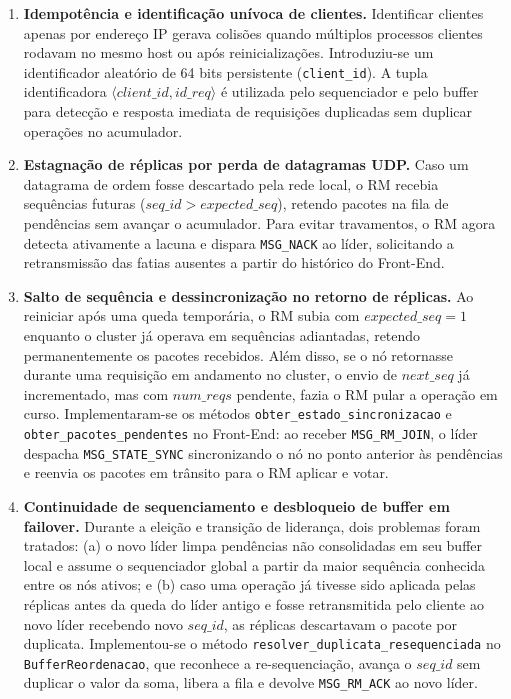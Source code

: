 \documentclass[12pt,a4paper]{article}
\newcommand{\arquivo}[1]{\texttt{#1}}
\newcommand{\mensagem}[1]{\texttt{#1}}
\begin{document}
\begin{enumerate}[label=\arabic*.]
    \item \textbf{Idempotência e identificação unívoca de clientes.} Identificar clientes apenas por endereço IP gerava colisões quando múltiplos processos clientes rodavam no mesmo host ou após reinicializações. Introduziu-se um identificador aleatório de 64 bits persistente (\arquivo{client\_id}). A tupla identificadora $\langle client\_id, id\_req \rangle$ é utilizada pelo sequenciador e pelo buffer para detecção e resposta imediata de requisições duplicadas sem duplicar operações no acumulador.

    \item \textbf{Estagnação de réplicas por perda de datagramas UDP.} Caso um datagrama de ordem fosse descartado pela rede local, o RM recebia sequências futuras ($seq\_id > expected\_seq$), retendo pacotes na fila de pendências sem avançar o acumulador. Para evitar travamentos, o RM agora detecta ativamente a lacuna e dispara \mensagem{MSG\_NACK} ao líder, solicitando a retransmissão das fatias ausentes a partir do histórico do Front-End.

    \item \textbf{Salto de sequência e dessincronização no retorno de réplicas.} Ao reiniciar após uma queda temporária, o RM subia com $expected\_seq=1$ enquanto o cluster já operava em sequências adiantadas, retendo permanentemente os pacotes recebidos. Além disso, se o nó retornasse durante uma requisição em andamento no cluster, o envio de $next\_seq$ já incrementado, mas com $num\_reqs$ pendente, fazia o RM pular a operação em curso. Implementaram-se os métodos \arquivo{obter\_estado\_sincronizacao} e \arquivo{obter\_pacotes\_pendentes} no Front-End: ao receber \mensagem{MSG\_RM\_JOIN}, o líder despacha \mensagem{MSG\_STATE\_SYNC} sincronizando o nó no ponto anterior às pendências e reenvia os pacotes em trânsito para o RM aplicar e votar.

    \item \textbf{Continuidade de sequenciamento e desbloqueio de buffer em failover.} Durante a eleição e transição de liderança, dois problemas foram tratados: (a) o novo líder limpa pendências não consolidadas em seu buffer local e assume o sequenciador global a partir da maior sequência conhecida entre os nós ativos; e (b) caso uma operação já tivesse sido aplicada pelas réplicas antes da queda do líder antigo e fosse retransmitida pelo cliente ao novo líder recebendo novo $seq\_id$, as réplicas descartavam o pacote por duplicata. Implementou-se o método \arquivo{resolver\_duplicata\_resequenciada} no \arquivo{BufferReordenacao}, que reconhece a re-sequenciação, avança o $seq\_id$ sem duplicar o valor da soma, libera a fila e devolve \mensagem{MSG\_RM\_ACK} ao novo líder.


\end{enumerate}
\end{document}
